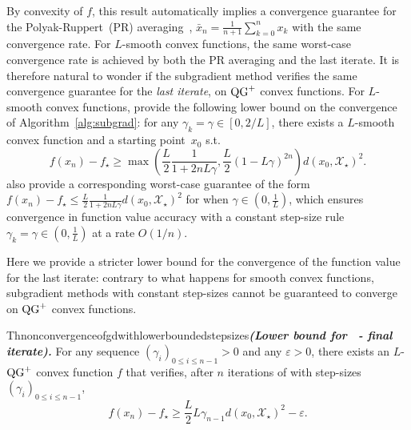 By convexity of $f$, this result automatically implies a convergence guarantee for the Polyak-Ruppert~(PR) averaging~\citep{polyak1992acceleration, ruppert1988efficient}, $\bar x_n = \frac{1}{n+1}\sum_{k=0}^n x_k$ with the same convergence rate. 
For $L$-smooth convex functions, the same worst-case convergence rate is achieved by both the PR averaging and the last iterate.
It is therefore natural to wonder if the subgradient method verifies the same convergence guarantee for the \emph{last iterate}, on $\operatorname{QG}^+$ convex functions. For $L$-smooth convex functions, \citet[Theorem 3.2]{drori2014performance} provide the following lower bound on the convergence of Algorithm~\ref{alg:subgrad}:
for any $\gamma_k=\gamma \in \left[0, 2/L \right]$, there exists a $L$-smooth convex function and a starting point~$x_0$ s.t.
\begin{equation}
    f(x_n) - f_\star \geq \max\left(\frac{L}{2}\frac{1}{1 + 2nL\gamma}, \frac{L}{2} \left( 1 - L\gamma \right)^{2n} \right)d(x_0, \mathcal{X}_\star)^2. \label{eq:gd_smooth}
\end{equation}
\citet[Theorem 3.1]{drori2014performance} also provide a corresponding worst-case guarantee of the form $f(x_n) - f_\star \leq \frac{L}{2}\frac{1}{1 + 2nL\gamma}d(x_0, \mathcal{X}_\star)^2$ for when $\gamma\in (0,\tfrac1L)$, which ensures convergence in function value accuracy with a constant step-size rule $\gamma_k=\gamma\in (0,\tfrac1L)$ at a rate $O(1/n)$.

Here we provide a stricter lower bound for the convergence of the function value for the last iterate: contrary to what happens for smooth convex functions, subgradient methods with constant step-sizes cannot be guaranteed to converge on $\operatorname{QG}^+$ convex functions.

\begin{restatable}{Th}{nonconvergenceofgdwithlowerboundedstepsizes}\textbf{\emph{(Lower bound for~ - final iterate).}}\label{thm:non_convergence_gd}
    \noindent For any sequence
    $(\gamma_i)_{0 \leq i \leq n-1}>0$ and any $\varepsilon>0$, there exists an $L$-$\operatorname{QG}^+$ convex function $f$ that verifies, after $n$ iterations of  with step-sizes $(\gamma_i)_{0 \leq i \leq n-1}$,
    \begin{equation} \label{eq:LB_QG}
        f(x_n) - f_\star \geq \frac{L}{2}L\gamma_{n-1} d(x_0, \mathcal{X}_\star)^2 - \varepsilon.
    \end{equation}
\end{restatable}

